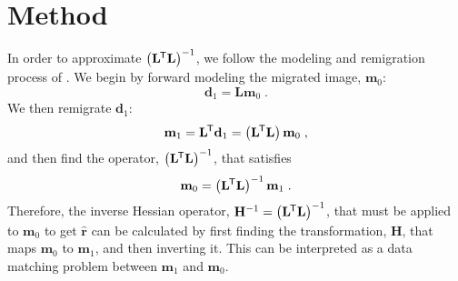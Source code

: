 \section{Method}

In order to approximate $\left ( \mathbf{L}^{\mkern-1.5mu\mathsf{T}}\mathbf{L}\right) ^{-1}$, we follow the modeling and remigration process of \cite{imop}. 
We begin by forward modeling the migrated image, $\mathbf{m}_0$:
\begin{equation}
        \mathbf{d}_1 = \mathbf{L}\mathbf{m}_0 \;.
\end{equation}
We then remigrate $\mathbf{d}_1$:
\begin{equation}
        \mathbf{m}_1 = \mathbf{L}^{\mkern-1.5mu\mathsf{T}}\mathbf{d}_1 = \left ( \mathbf{L}^{\mkern-1.5mu\mathsf{T}}\mathbf{L}\right ) \mathbf{m}_0 \; ,
\end{equation}
and then find the operator, $\left ( \mathbf{L} ^{\mkern-1.5mu\mathsf{T}} \mathbf{L} \right )^{-1}$, that satisfies
\begin{equation}
        \mathbf{m}_0 = \left ( \mathbf{L}^{\mkern-1.5mu\mathsf{T}}\mathbf{L} \right ) ^{-1} \mathbf{m}_1 \;.
\end{equation}
Therefore, the inverse Hessian operator, $\mathbf{H}^{-1} = \left ( \mathbf{L} ^{\mkern-1.5mu\mathsf{T}} \mathbf{L} \right )^{-1}$, that must be applied to $\mathbf{m}_0$ to get $\hat{\mathbf{r}}$ can be calculated by first finding the transformation, $\mathbf{H}$, that maps $\mathbf{m}_0$ to $\mathbf{m}_1$, and then inverting it.
This can be interpreted as a data matching problem between $\mathbf{m}_1$ and $\mathbf{m}_0$.

